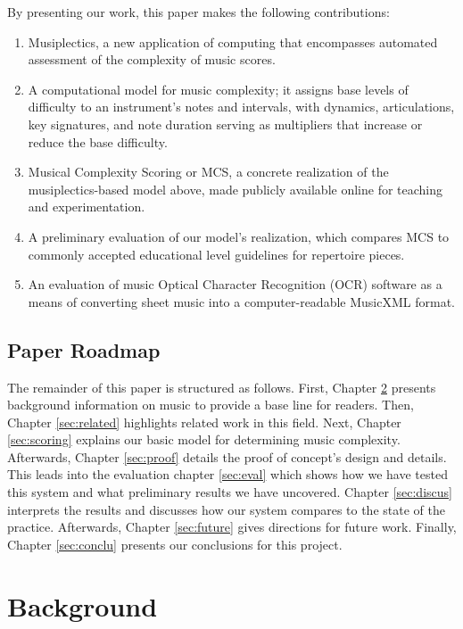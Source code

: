\documentclass[12pt]{report}
\begin{document}
By presenting our work, this paper makes the following contributions:

\begin{enumerate}
\item Musiplectics, a new application of computing that encompasses automated assessment of the complexity of music scores.
\item A computational model for music complexity; it assigns base levels of difficulty to an instrument's notes and intervals, with dynamics, articulations, key signatures, and note duration serving as multipliers that increase or reduce the base difficulty.
\item Musical Complexity Scoring or MCS, a concrete realization of the musiplectics-based model above, made publicly available online for teaching and experimentation.
\item A preliminary evaluation of our model's realization, which compares MCS to commonly accepted educational level guidelines for repertoire pieces.
\item An evaluation of music Optical Character Recognition (OCR) software as a means of converting sheet music into a computer-readable MusicXML format.
\end{enumerate}

\section{Paper Roadmap} 
\label{sec:layout}

The remainder of this paper is structured as follows. First, Chapter \ref{sec:background} presents background information on music to provide a base line for readers. Then, Chapter \ref{sec:related} highlights related work in this field. Next, Chapter \ref{sec:scoring} explains our basic model for determining music complexity. Afterwards, Chapter \ref{sec:proof} details the proof of concept's design and details. This leads into the evaluation chapter \ref{sec:eval} which shows how we have tested this system and what preliminary results we have uncovered. Chapter \ref{sec:discus} interprets the results and discusses how our system compares to the state of the practice. Afterwards, Chapter \ref{sec:future} gives directions for future work. Finally, Chapter \ref{sec:conclu} presents our conclusions for this project.

\chapter{Background} 
\label{sec:background}
\end{document}
